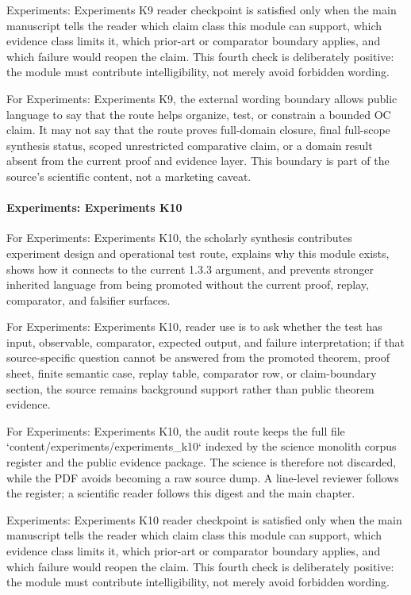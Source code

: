 Experiments: Experiments K9 reader checkpoint is satisfied only when the main manuscript tells the reader which claim class this module can support, which evidence class limits it, which prior-art or comparator boundary applies, and which failure would reopen the claim. This fourth check is deliberately positive: the module must contribute intelligibility, not merely avoid forbidden wording.


For Experiments: Experiments K9, the external wording boundary allows public language to say that the route helps organize, test, or constrain a bounded OC claim. It may not say that the route proves full-domain closure, final full-scope synthesis status, scoped unrestricted comparative claim, or a domain result absent from the current proof and evidence layer. This boundary is part of the source's scientific content, not a marketing caveat.


\paragraph{Experiments: Experiments K10}

For Experiments: Experiments K10, the scholarly synthesis contributes experiment design and operational test route, explains why this module exists, shows how it connects to the current 1.3.3 argument, and prevents stronger inherited language from being promoted without the current proof, replay, comparator, and falsifier surfaces.


For Experiments: Experiments K10, reader use is to ask whether the test has input, observable, comparator, expected output, and failure interpretation; if that source-specific question cannot be answered from the promoted theorem, proof sheet, finite semantic case, replay table, comparator row, or claim-boundary section, the source remains background support rather than public theorem evidence.


For Experiments: Experiments K10, the audit route keeps the full file `content/experiments/experiments\_k10` indexed by the science monolith corpus register and the public evidence package. The science is therefore not discarded, while the PDF avoids becoming a raw source dump. A line-level reviewer follows the register; a scientific reader follows this digest and the main chapter.


Experiments: Experiments K10 reader checkpoint is satisfied only when the main manuscript tells the reader which claim class this module can support, which evidence class limits it, which prior-art or comparator boundary applies, and which failure would reopen the claim. This fourth check is deliberately positive: the module must contribute intelligibility, not merely avoid forbidden wording.


